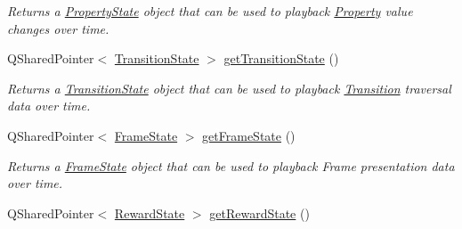 \begin{DoxyCompactItemize}
\begin{DoxyCompactList}\small\item\em Returns a \hyperlink{class_picto_1_1_property_state}{Property\-State} object that can be used to playback \hyperlink{class_picto_1_1_property}{Property} value changes over time. \end{DoxyCompactList}\item 
\hypertarget{class_picto_1_1_session_state_aa0669335b0a30a12c4ba486623100e14}{Q\-Shared\-Pointer$<$ \hyperlink{class_picto_1_1_transition_state}{Transition\-State} $>$ \hyperlink{class_picto_1_1_session_state_aa0669335b0a30a12c4ba486623100e14}{get\-Transition\-State} ()}\label{class_picto_1_1_session_state_aa0669335b0a30a12c4ba486623100e14}

\begin{DoxyCompactList}\small\item\em Returns a \hyperlink{class_picto_1_1_transition_state}{Transition\-State} object that can be used to playback \hyperlink{class_picto_1_1_transition}{Transition} traversal data over time. \end{DoxyCompactList}\item 
\hypertarget{class_picto_1_1_session_state_a67ca5458e97f77ac03ad53cf285fa4ff}{Q\-Shared\-Pointer$<$ \hyperlink{class_picto_1_1_frame_state}{Frame\-State} $>$ \hyperlink{class_picto_1_1_session_state_a67ca5458e97f77ac03ad53cf285fa4ff}{get\-Frame\-State} ()}\label{class_picto_1_1_session_state_a67ca5458e97f77ac03ad53cf285fa4ff}

\begin{DoxyCompactList}\small\item\em Returns a \hyperlink{class_picto_1_1_frame_state}{Frame\-State} object that can be used to playback Frame presentation data over time. \end{DoxyCompactList}\item 
\hypertarget{class_picto_1_1_session_state_a30bcdb515b9da162c3e51f9eb74b3e2a}{Q\-Shared\-Pointer$<$ \hyperlink{class_picto_1_1_reward_state}{Reward\-State} $>$ \hyperlink{class_picto_1_1_session_state_a30bcdb515b9da162c3e51f9eb74b3e2a}{get\-Reward\-State} ()}\label{class_picto_1_1_session_state_a30bcdb515b9da162c3e51f9eb74b3e2a}


\end{DoxyCompactItemize}
